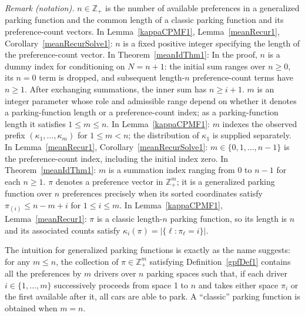 \documentclass[opre,nonblindrev]{informs3_no_remark}
\begin{document}
\noindent\textit{Remark (notation).} $n\in\mathbb{Z}_+$ is the number of available preferences in a generalized parking function and the common length of a classic parking function and its preference-count vectors. In Lemma~\ref{kappaCPMF1}, Lemma~\ref{meanRecur1}, Corollary~\ref{meanRecurSolve1}: $n$ is a fixed positive integer specifying the length of the preference-count vector. In Theorem~\ref{meanIdThm1}: In the proof, $n$ is a dummy index for conditioning on $N=n+1$: the initial sum ranges over $n\geq0$, its $n=0$ term is dropped, and subsequent length-$n$ preference-count terms have $n\geq1$. After exchanging summations, the inner sum has $n\geq i+1$. $m$ is an integer parameter whose role and admissible range depend on whether it denotes a parking-function length or a preference-count index; as a parking-function length it satisfies $1\leq m\leq n$. In Lemma~\ref{kappaCPMF1}: $m$ indexes the observed prefix $(\kappa_1,\dots,\kappa_m)$ for $1\leq m<n$; the distribution of $\kappa_1$ is supplied separately. In Lemma~\ref{meanRecur1}, Corollary~\ref{meanRecurSolve1}: $m\in\{0,1,\dots,n-1\}$ is the preference-count index, including the initial index zero. In Theorem~\ref{meanIdThm1}: $m$ is a summation index ranging from $0$ to $n-1$ for each $n\geq1$. $\pi$ denotes a preference vector in $\mathbb{Z}_+^m$; it is a generalized parking function over $n$ preferences precisely when its sorted coordinates satisfy $\pi_{(i)}\leq n-m+i$ for $1\leq i\leq m$. In Lemma~\ref{kappaCPMF1}, Lemma~\ref{meanRecur1}: $\pi$ is a classic length-$n$ parking function, so its length is $n$ and its associated counts satisfy $\kappa_i(\pi)=|\{\ell:\pi_\ell=i\}|$.


The intuition for generalized parking functions is exactly as the name suggests: for any $m \leq n$, the collection of $\pi \in \mathbb{Z}_+^m$ satisfying Definition~\ref{gpfDef1} contains all the preferences by $m$ drivers over $n$ parking spaces such that, if each driver $i \in \{1, \dots, m\}$ successively proceeds from space 1 to $n$ and takes either space $\pi_i$ or the first available after it, all cars are able to park.
A ``classic'' parking function is obtained when $m = n$. 


\end{document}
